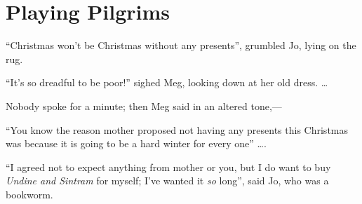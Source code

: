 \documentclass{book}
\newcommand{\WorkTitle}{\emph} %
\begin{document}
\chapter{%
Playing Pilgrims
}

\enquote{Christmas won't be Christmas without any presents}, grumbled Jo, 
lying on the rug.

\enquote{It's so dreadful to be poor!} sighed Meg, looking down at her old dress. \dots

Nobody spoke for a minute; then Meg said in an altered tone,---

\enquote{You know the reason mother proposed not having any presents 
 this Christmas was because it is going to be a hard winter for every one} \dots.

\enquote{I agreed not to expect anything from mother or you, 
but I do want to buy \WorkTitle{Undine and Sintram} for myself; 
I've wanted it \emph{so} long}, said Jo, who was a bookworm.
\end{document}
